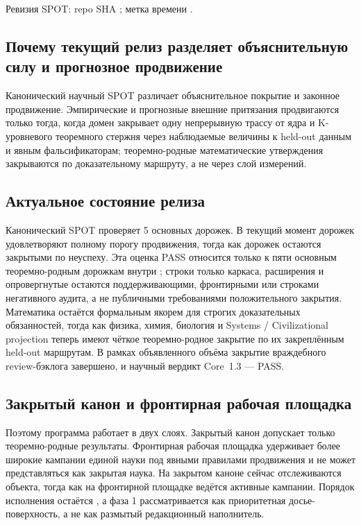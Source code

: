 Ревизия SPOT: repo SHA ; метка времени .

\subsection{Почему текущий релиз разделяет объяснительную силу и прогнозное продвижение}
Канонический научный SPOT различает объяснительное покрытие и законное продвижение. Эмпирические и прогнозные внешние притязания продвигаются только тогда, когда домен закрывает одну непрерывную трассу от ядра и K-уровневого теоремного стержня через наблюдаемые величины к held-out данным и явным фальсификаторам; теоремно-родные математические утверждения закрываются по доказательному маршруту, а не через слой измерений.

\subsection{Актуальное состояние релиза}
Канонический SPOT проверяет 5 основных дорожек. В текущий момент  дорожек удовлетворяют полному порогу продвижения, тогда как  дорожек остаются закрытыми по неуспеху.
Эта оценка PASS относится только к пяти основным теоремно-родным дорожкам внутри ; строки только каркаса, расширения и опровергнутые остаются поддерживающими, фронтирными или строками негативного аудита, а не публичными требованиями положительного закрытия.
Математика остаётся формальным якорем для строгих доказательных обязанностей, тогда как физика, химия, биология и Systems / Civilizational projection теперь имеют чёткое теоремно-родное закрытие по их закреплённым held-out маршрутам. В рамках объявленного объёма  закрытие враждебного review-бэклога завершено, и научный вердикт Core~1.3 — PASS.

\subsection{Закрытый канон и фронтирная рабочая площадка}
Поэтому программа работает в двух слоях. Закрытый канон допускает только теоремно-родные результаты. Фронтирная рабочая площадка удерживает более широкие кампании единой науки под явными правилами продвижения и не может представляться как закрытая наука.
На закрытом каноне сейчас отслеживаются  объекта, тогда как на фронтирной площадке ведётся  активные кампании.
Порядок исполнения остаётся , а фаза 1 рассматривается как приоритетная досье-поверхность, а не как размытый редакционный наполнитель.

